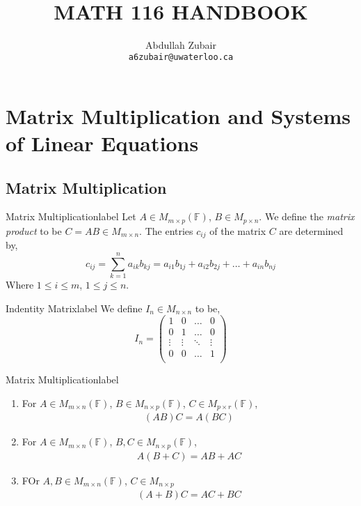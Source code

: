 \documentclass[12pt]{article}
\title{ \normalsize \textsc{}   %
      \\[2.0cm]               %
      \HRule{0.5pt} \\            %
      \LARGE \textbf{\uppercase{Math 116 Handbook}} %
      \HRule{2pt} \\ [0.5cm]    %
      \normalsize     %
    }
\author{
    Abdullah Zubair\\
        \texttt{a6zubair@uwaterloo.ca} \\
}
\theoremstyle{definition}
\newcommand{\F}{\ensuremath{\mathbb{F}}}
\begin{document}
\setcounter{section}{1}
\section{Matrix Multiplication and Systems of Linear Equations}
\subsection{Matrix Multiplication}

\begin{definition}{Matrix Multiplication}{label}
   Let $A \in M_{m \times p}(\F)$, $B \in M_{p \times n}$. We define the \emph{matrix product} to be $C = AB \in M_{m\times n}$. The entries $c_{ij}$ of the matrix $C$ are determined by,
   $$c_{ij} = \sum_{k = 1}^n a_{ik}b_{kj} = a_{i1}b_{1j} + a_{i2}b_{2j} + \dots + a_{in}b_{nj}$$
   Where $1 \leq i \leq m$, $1 \leq j \leq n$. 
\end{definition}
\begin{definition}{Indentity Matrix}{label}
    We define $I_n \in M_{n \times n}$ to be,
    $$ I_n = \begin{pmatrix}
       1 & 0 & \dots & 0 \\ 
       0 & 1 & \dots & 0 \\ 
       \vdots & \vdots & \ddots & \vdots \\ 
       0 & 0 & \dots & 1 \\ 
    \end{pmatrix}$$
\end{definition}

\begin{properties}{Matrix Multiplication}{label}
    \begin{enumerate}
        \item 
        For $A \in M_{m \times n}(\F)$, $B \in M_{n\times p}(\F)$, $C \in M_{p \times r}(\F)$,
        \begin{align*}
            (AB)C = A(BC) \tag{Associative}
        \end{align*}
        \item 
        For $A \in M_{m \times n}(\F)$, $B,C\in M_{n\times p}(\F)$,
        \begin{align*}
            A(B + C) = AB + AC \tag{Left distributivity}
        \end{align*}
        \item FOr $A,B \in M_{m\times n}(\F)$, $C\in M_{n\times p}$
        \begin{align*}
            (A + B)C = AC + BC \tag{Right distributivity}
        \end{align*}

    \end{enumerate}
\end{properties}
\end{document}
